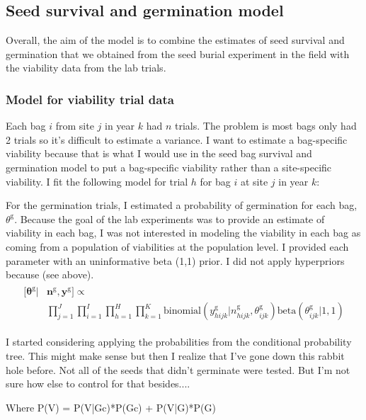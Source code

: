 \documentclass[12pt, oneside, titlepage]{article}   	%
\begin{document}
\subsection*{Seed survival and germination model}

Overall, the aim of the model is to combine the estimates of seed survival and germination that we obtained from the seed burial experiment in the field with the viability data from the lab trials. 

\subsubsection*{Model for viability trial data}

Each bag $i$ from site $j$ in year $k$ had $n$ trials. The problem is most bags only had 2 trials so it's difficult to estimate a variance. I want to estimate a bag-specific viability because that is what I would use in the seed bag survival and germination model to put a bag-specific viability rather than a site-specific viability. I fit the following model for trial $h$ for bag $i$ at site $j$ in year $k$:

For the germination trials, I estimated a probability of germination for each bag, $\theta^\mathrm{g}$. Because the goal of the lab experiments was to provide an estimate of viability in each bag, I was not interested in modeling the viability in each bag as coming from a population of viabilities at the population level. I provided each parameter with an uninformative beta (1,1) prior. I did not apply hyperpriors because (see above).
%
\begin{align}
  \begin{split}
 [\bm{\theta^{\mathrm{g}}} | & \bm{n^{\mathrm{g}}}, \bm{y^{\mathrm{g}}} ] \propto
 \\  & \prod_{j=1}^{J} \prod_{i=1}^{I}  \prod_{h=1}^{H} \prod_{k=1}^{K}  \mathrm{binomial} ( y^{\mathrm{g}}_{hijk} | n^{\mathrm{g}}_{hijk}, \theta^{\mathrm{g}}_{ijk} )
\mathrm{beta} (  \theta^{\mathrm{g}}_{ijk} | 1 , 1 )
  \end{split}
\end{align}

I started considering applying the probabilities from the conditional probability tree. This might make sense but then I realize that I've gone down this rabbit hole before. Not all of the seeds that didn't germinate were tested. But I'm not sure how else to control for that besides....

Where P(V) = P(V|Gc)*P(Gc) + P(V|G)*P(G)
\end{document}
